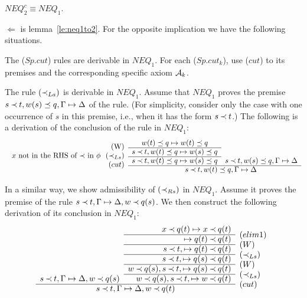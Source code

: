 \begin{CLAIM}\label{le:neq1isneq2}
$NEQ_2^c \equiv NEQ_1$.\end{CLAIM}
\begin{PROOF}
$\Leftarrow$ is lemma~\ref{le:neq1to2}. For the opposite implication we have 
the following situations.
\begin{LS}
\item The ($Sp.cut$) rules  are derivable in $NEQ_1$.
For each ($Sp.cut_k$), use ($cut$) to its premises and the 
corresponding specific axiom ${\cal {A}}_k$.
\item  The rule $(\mathbin{\prec}_{La})$ is derivable in $NEQ_1$.
Assume that $NEQ_1$ proves the premise 
$s\mathbin{\prec} t, w(s)\preceq q,\Gamma\mathrel{\mapsto}\Delta$ %
 of the rule. (For simplicity, 
consider only the case with one occurrence of $s$ in this premise, i.e., when
it has the form $s\mathbin{\prec} t$.)
The following is a derivation of
the conclusion of the rule in $NEQ_1$:
\[ \begin{array}{rcc}
\raisebox{-1.2ex}[1.5ex][0ex]{(W)} & w(t)\preceq q\Seq w(t)\preceq q &  \\ \cline{2-2}
\raisebox{-1.2ex}[1.5ex][0ex]{
$x$ not in the RHS of $\Incl$ in $\phi$\ \ $\iLs$} %
 & s\Incl t,w(t)\preceq q\Seq w(s)\preceq q & 
      \\ \cline{2-2}
 \raisebox{-1.2ex}[1.5ex][0ex]{($cut$)} 
& s\Incl t, w(t)\preceq q\Seq w(s)\preceq q & s\Incl t, w(s)\preceq q,\GSD 
   \\ \cline{2-3}
& \multicolumn{2}{c}{\ \ \ \ \ s\Incl t,w(t)\preceq q,\GSD}
\end{array} \]
\item In a similar way, we show admissibility of $(\mathbin{\prec}_{Rs})$ in $NEQ_1$. Assume it
proves the premise of the rule $s\mathbin{\prec} t, \Gamma\mathrel{\mapsto}\Delta, w\mathbin{\prec} q(s)$. We then construct the 
following derivation of its conclusion in $NEQ_1$:
\[ \begin{array}{rrl}
& x\Incl q(t) \Seq x\Incl q(t) \\ \cline{2-2}
& \Seq q(t)\Incl q(t) & \rabove{(elim1)} \\ \cline{2-2}
& s\Incl t, \Seq q(t)\Incl q(t) & \rabove{(W)} \\ \cline{2-2}
& s\Incl t, \Seq q(s)\Incl q(t) & \rabove{\iLs} \\ \cline{2-2}
& w\Incl q(s), s\Incl t, \Seq q(s)\Incl q(t) & \rabove{(W)} \\ \cline{2-2}
s\Incl t, \GSD, w\Incl q(s) & w\Incl q(s), s\Incl t, \Seq w \Incl q(t) & \rabove{\iLs} \\ \cline{1-2}
\multicolumn{2}{c}{ s\Incl t, \GSD, w\Incl q(t) } & \rabove{(cut)}
\end{array} \]
\end{LS} \vspace*{-1ex}
\end{PROOF} \vspace*{-2ex}

